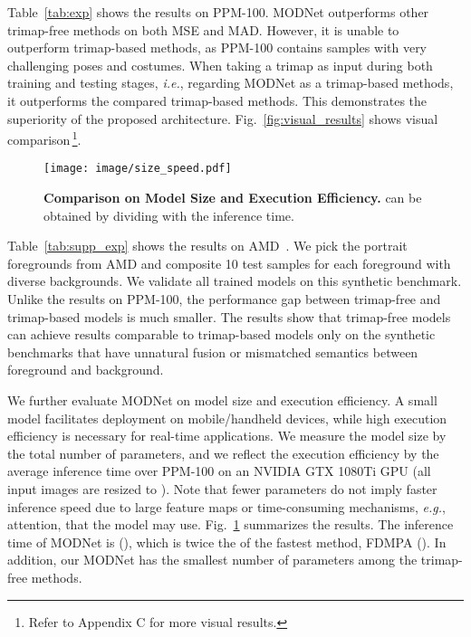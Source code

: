 \documentclass[letterpaper]{article} \usepackage{aaai22}  \usepackage{times}  \usepackage{helvet}  \usepackage{courier}  \usepackage[hyphens]{url}  \usepackage{graphicx} \urlstyle{rm} \def\UrlFont{\rm}  \usepackage{natbib}  \usepackage{caption} \usepackage{booktabs}
\begin{document}
Table~\ref{tab:exp} shows the results on PPM-100. MODNet outperforms other trimap-free methods on both MSE and MAD. However, it is unable to outperform trimap-based methods, as PPM-100 contains samples with very challenging poses and costumes. 
When taking a trimap as input during both training and testing stages, {\it i.e.}, regarding MODNet as a trimap-based methods,
it outperforms the compared trimap-based methods.
This demonstrates the superiority of the proposed architecture. Fig.~\ref{fig:visual_results} shows visual comparison\,\footnote{Refer to Appendix C for more visual results.}.





\begin{figure}[t]
\begin{center}
\texttt{[image: image/size\_speed.pdf]}
\end{center}
  \caption{\textbf{Comparison on Model Size and Execution Efficiency.} 
   can be obtained by dividing  with the inference time.
  }
\label{fig:efficient}
\end{figure}



Table~\ref{tab:supp_exp} shows the results on AMD~\cite{DIM}. We pick the portrait foregrounds from AMD and composite 10 test samples for each foreground with diverse backgrounds. We validate all trained models on this synthetic benchmark. Unlike the results on PPM-100, the performance gap between trimap-free and trimap-based models is much smaller. 
The results show that trimap-free models can achieve results comparable to trimap-based models only on the synthetic benchmarks that have unnatural fusion or mismatched semantics between foreground and background.




We further evaluate MODNet on model size and execution efficiency. A small model facilitates deployment on mobile/handheld devices, while high execution efficiency is necessary for real-time applications. We measure the model size by the total number of parameters, and we reflect the execution efficiency by the average inference time over PPM-100 on an NVIDIA GTX 1080Ti GPU (all input images are resized to ). Note that fewer parameters do not imply faster inference speed due to large feature maps or time-consuming mechanisms, {\it e.g.}, attention, that the model may use. Fig.~\ref{fig:efficient} summarizes the results. The inference time of MODNet is  (), which is twice the  of the fastest method, FDMPA (). In addition, our MODNet has the smallest number of parameters among the trimap-free methods.
\end{document}
